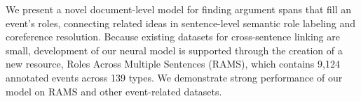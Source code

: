 We present a novel document-level model for finding argument spans that fill an event's roles, connecting related ideas in sentence-level semantic role labeling and coreference resolution. Because existing datasets for cross-sentence linking are small, development of our neural model is supported through the creation of a new resource, Roles Across Multiple Sentences (RAMS), which contains 9,124 annotated events across 139 types. We demonstrate strong performance of our model on RAMS and other event-related datasets.
